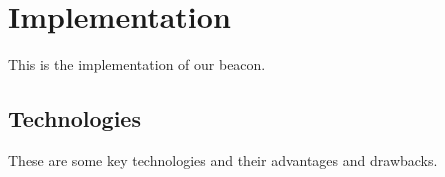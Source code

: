 \section{Implementation}
\label{sec:implementation}
This is the implementation of our beacon.

\subsection{Technologies}
\label{sub:technologies}
These are some key technologies and their advantages and drawbacks.

